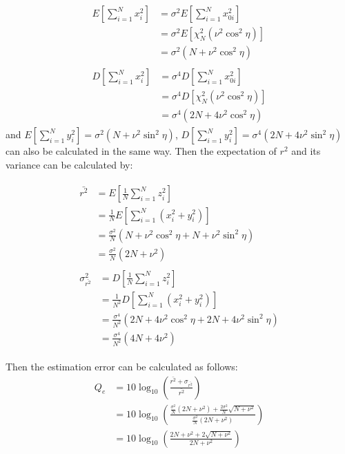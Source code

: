 \begin{subequations}
\begin{eqnarray}
\begin{split}
  E\left[\sum_{i=1}^{N}x_i^2\right]&=\sigma^2E\left[\sum_{i=1}^{N}x_{0i}^2\right] \\
  &=\sigma^2E\left[\chi_N^2(\nu^2\cos^2\eta)\right] \\
  &=\sigma^2\left(N+\nu^2\cos^2\eta\right)
\label{app:Ex}
\end{split} \\
\begin{split}
  D\left[\sum_{i=1}^{N}x_i^2\right]&=\sigma^4D\left[\sum_{i=1}^{N}x_{0i}^2\right] \\
  &=\sigma^4D\left[\chi_N^2(\nu^2\cos^2\eta)\right] \\
  &=\sigma^4\left(2N+4\nu^2\cos^2\eta\right)
\label{app:Dx}
\end{split}
\end{eqnarray}
\label{app:x}
\end{subequations}
and $E[\sum_{i=1}^{N}y_i^2]=\sigma^2(N+\nu^2\sin^2\eta)$, $D[\sum_{i=1}^{N}y_i^2]=\sigma^4(2N+4\nu^2\sin^2\eta)$ can also be calculated in the same way. Then the expectation of $r^2$ and its variance can be calculated by:

\begin{subequations}
\begin{eqnarray}
\begin{split}
  \bar{r^2}&=E\left[\frac{1}{N}\sum_{i=1}^{N}z_i^2\right] \\
    &=\frac{1}{N}E\left[\sum_{i=1}^{N}(x_i^2+y_i^2)\right]\\
    &=\frac{\sigma^2}{N}\left(N+\nu^2\cos^2\eta+N+\nu^2\sin^2\eta\right)\\
    &=\frac{\sigma^2}{N}\left(2N+\nu^2\right)
  \label{app:Er2}
\end{split} \\
\begin{split}
  \sigma_{\bar{r^2}}^2&=D\left[\frac{1}{N}\sum_{i=1}^{N}z_i^2\right] \\
    &=\frac{1}{N^2}D\left[\sum_{i=1}^{N}\left(x_i^2+y_i^2\right)\right]\\
    &=\frac{\sigma^4}{N^2}\left(2N+4\nu^2\cos^2\eta+2N+4\nu^2\sin^2\eta\right)\\
    &=\frac{\sigma^4}{N^2}\left(4N+4\nu^2\right)
  \label{app:Dr2}
\end{split}
\end{eqnarray}
\label{app:r2}
\end{subequations}

Then the estimation error can be calculated as follows:
\begin{equation}
\begin{split}
    Q_e&=10 \log_{10}\left(\frac{\bar{r^2}+\sigma_{\bar{r^2}}}{\bar{r^2}}\right)\\
    &=10 \log_{10}\left(\frac{\frac{\sigma^2}{N}\left(2N+\nu^2\right)+\frac{2\sigma^2}{N}\sqrt{N+\nu^2}}{\frac{\sigma^2}{N}(2N+\nu^2)}\right)\\
    &=10 \log_{10}\left(\frac{2N+\nu^2+2\sqrt{N+\nu^2}}{2N+\nu^2}\right)
\end{split}
\label{app:Q_e}
\end{equation}
